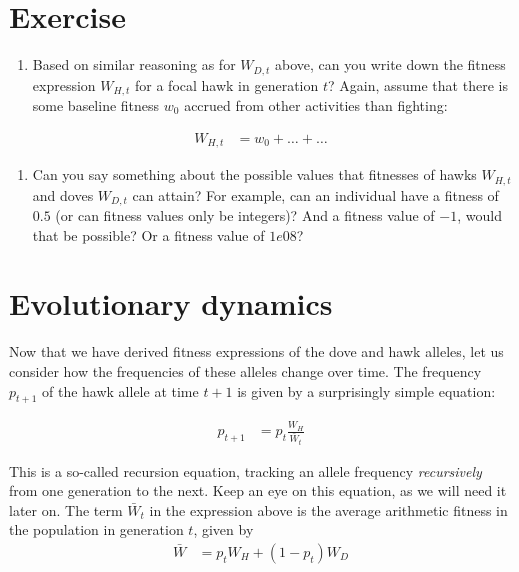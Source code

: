 \documentclass[
]{book}
\providecommand{\tightlist}{%
  \setlength{\itemsep}{0pt}\setlength{\parskip}{0pt}}
\begin{document}
\hypertarget{exercise-2}{%
\section{Exercise}\label{exercise-2}}

\begin{enumerate}
\def\labelenumi{\arabic{enumi}.}
\tightlist
\item
  Based on similar reasoning as for \(W_{D,t}\) above, can you write down the fitness expression \(W_{H,t}\) for a focal hawk in generation \(t\)? Again, assume that there is some baseline fitness \(w_{0}\) accrued from other activities than fighting:
\end{enumerate}

\begin{align}
W_{H,t} &= w_{0} + \ldots + \ldots
\end{align}

\begin{enumerate}
\def\labelenumi{\arabic{enumi}.}
\setcounter{enumi}{1}
\tightlist
\item
  Can you say something about the possible values that fitnesses of hawks \(W_{H,t}\) and doves \(W_{D,t}\) can attain? For example, can an individual have a fitness of \(0.5\) (or can fitness values only be integers)? And a fitness value of \(-1\), would that be possible? Or a fitness value of \(1e08\)?
\end{enumerate}

\hypertarget{evolutionary-dynamics}{%
\section{Evolutionary dynamics}\label{evolutionary-dynamics}}

Now that we have derived fitness expressions of the dove and hawk alleles, let us consider how the frequencies of these alleles change over time. The frequency \(p_{t+1}\) of the hawk allele at time \(t+1\) is given by a surprisingly simple equation:

\begin{align}
p_{t+1} &= p_{t} \frac{W_{H}}{\bar{W}_{t}}
\end{align}

This is a so-called recursion equation, tracking an allele frequency \emph{recursively} from one generation to the next. Keep an eye on this equation, as we will need it later on. The term \(\bar{W}_{t}\) in the expression above is the average arithmetic fitness in the population in generation \(t\), given by
\begin{align}
\bar{W} &= p_{t} W_{H} + \left(1 - p_{t} \right ) W_{D}
\end{align}
\end{document}
